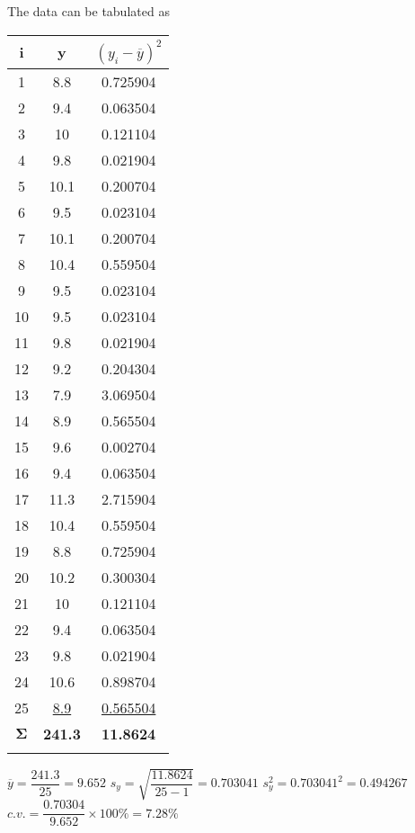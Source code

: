 \documentclass[../main.tex]{subfiles}
\begin{document}
\chapter{}
\label{cha:cha_12}


\section{}
The data can be tabulated as
\bigbreak
\label{sec:sec_12_1}
	\begin{tabular}{ccc}
		\Xhline{1.5pt} i&y&$(y_{i}-\overline{y})^{2}$\\
		\hline1&8.8&0.725904\\
		2&9.4&0.063504\\
		3&10&0.121104\\
		4&9.8&0.021904\\
		5&10.1&0.200704\\
		6&9.5&0.023104\\
		7&10.1&0.200704\\
		8&10.4&0.559504\\
		9&9.5&0.023104\\
		10&9.5&0.023104\\
		11&9.8&0.021904\\
		12&9.2&0.204304\\
		13&7.9&3.069504\\
		14&8.9&0.565504\\
		15&9.6&0.002704\\
		16&9.4&0.063504\\
		17&11.3&2.715904\\
		18&10.4&0.559504\\
		19&8.8&0.725904\\
		20&10.2&0.300304\\
		21&10&0.121104\\
		22&9.4&0.063504\\
		23&9.8&0.021904\\
		24&10.6&0.898704\\
		25&\underline{8.9}&\underline{0.565504}\\
		$\bm\Sigma$&\bfseries 241.3&\bfseries11.8624\\
		\Xhline{1.5pt}
	\end{tabular}
	\bigbreak
$\overline{y}=\dfrac{241.3}{25}=9.652$
	\bigbreak
$s_{y}=\sqrt{\dfrac{11.8624}{25-1}}=0.703041$
	\bigbreak
$s_{y}^{2}=0.703041^{2}=0.494267$
	\bigbreak
$c.v.=\dfrac{0.70304}{9.652}\times100\%=7.28\%$
	\bigbreak
\end{document}

